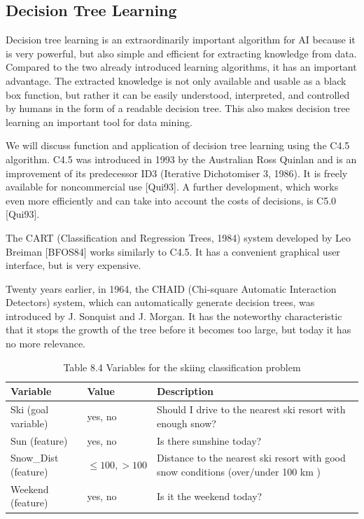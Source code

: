 \documentclass[10pt]{article}
\begin{document}
\subsection*{Decision Tree Learning}
Decision tree learning is an extraordinarily important algorithm for AI because it is very powerful, but also simple and efficient for extracting knowledge from data. Compared to the two already introduced learning algorithms, it has an important advantage. The extracted knowledge is not only available and usable as a black box function, but rather it can be easily understood, interpreted, and controlled by humans in the form of a readable decision tree. This also makes decision tree learning an important tool for data mining.

We will discuss function and application of decision tree learning using the C4.5 algorithm. C4.5 was introduced in 1993 by the Australian Ross Quinlan and is an improvement of its predecessor ID3 (Iterative Dichotomiser 3, 1986). It is freely available for noncommercial use [Qui93]. A further development, which works even more efficiently and can take into account the costs of decisions, is C5.0 [Qui93].

The CART (Classification and Regression Trees, 1984) system developed by Leo Breiman [BFOS84] works similarly to C4.5. It has a convenient graphical user interface, but is very expensive.

Twenty years earlier, in 1964, the CHAID (Chi-square Automatic Interaction Detectors) system, which can automatically generate decision trees, was introduced by J. Sonquist and J. Morgan. It has the noteworthy characteristic that it stops the growth of the tree before it becomes too large, but today it has no more relevance.

\begin{table}[h]
\begin{center}
\captionsetup{labelformat=empty}
\caption{Table 8.4 Variables for the skiing classification problem}
\begin{tabular}{|l|l|l|}
\hline
Variable & Value & Description \\
\hline
Ski (goal variable) & yes, no & Should I drive to the nearest ski resort with enough snow? \\
\hline
Sun (feature) & yes, no & Is there sunshine today? \\
\hline
Snow\_Dist (feature) & $\leq 100,>100$ & Distance to the nearest ski resort with good snow conditions (over/under 100 km ) \\
\hline
Weekend (feature) & yes, no & Is it the weekend today? \\
\hline
\end{tabular}
\end{center}
\end{table}
\end{document}
